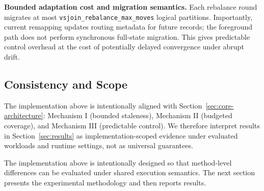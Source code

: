 \textbf{Bounded adaptation cost and migration semantics.}
Each rebalance round migrates at most \texttt{vsjoin\_rebalance\_max\_moves} logical partitions. Importantly, current remapping updates routing metadata for future records; the foreground path does not perform synchronous full-state migration. This gives predictable control overhead at the cost of potentially delayed convergence under abrupt drift.

\subsection{Consistency and Scope}

The implementation above is intentionally aligned with Section~\ref{sec:core-architecture}: Mechanism I (bounded staleness), Mechanism II (budgeted coverage), and Mechanism III (predictable control). We therefore interpret results in Section~\ref{sec:results} as implementation-scoped evidence under evaluated workloads and runtime settings, not as universal guarantees.

The implementation above is intentionally designed so that method-level differences can be evaluated under shared execution semantics. The next section presents the experimental methodology and then reports results.

